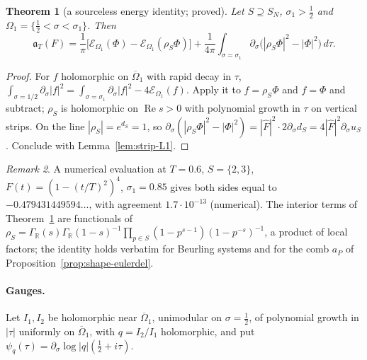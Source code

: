 \documentclass[11pt]{amsart}
\newtheorem{theorem}{Theorem}[section]
\theoremstyle{definition}
\theoremstyle{remark}
\newtheorem{remark}[theorem]{Remark}
\newcommand{\R}{\mathbb R}
\newcommand{\Rel}{\operatorname{Re}}
\newcommand{\Fh}{\widehat F}
\begin{document}
\begin{theorem}[a sourceless energy identity; proved]\label{thm:strip-R1}
Let $S\supseteq S_N$, $\sigma_1>\frac12$ and $\Omega_1=\{\frac12<\sigma<\sigma_1\}$. Then
\[
\mathfrak a_T(F)=\frac1\pi\big[\mathcal E_{\Omega_1}(\Phi)-\mathcal E_{\Omega_1}(\rho_S\Phi)\big]
+\frac1{4\pi}\int_{\sigma=\sigma_1}\partial_\sigma\big(|\rho_S\Phi|^2-|\Phi|^2\big)\,d\tau .
\]
\end{theorem}
\begin{proof}
For $f$ holomorphic on $\overline\Omega_1$ with rapid decay in $\tau$, $\int_{\sigma=1/2}\partial_\sigma|f|^2=\int_{\sigma=\sigma_1}\partial_\sigma|f|^2-4\mathcal E_{\Omega_1}(f)$.
Apply it to $f=\rho_S\Phi$ and $f=\Phi$ and subtract; $\rho_S$ is holomorphic on $\Rel s>0$ with polynomial growth in $\tau$ on
vertical strips. On the line $|\rho_S|=e^{d_S}=1$, so $\partial_\sigma(|\rho_S\Phi|^2-|\Phi|^2)=|\Fh|^2\cdot2\partial_\sigma d_S=4|\Fh|^2\partial_\sigma u_S$.
Conclude with Lemma~\ref{lem:strip-L1}.
\end{proof}

\begin{remark}
A numerical evaluation at $T=0.6$, $S=\{2,3\}$, $F(t)=(1-(t/T)^2)^4$, $\sigma_1=0.85$ gives both sides equal to $-0.479431449594\ldots$,
with agreement $1.7\cdot10^{-13}$ (numerical). The interior terms of Theorem~\ref{thm:strip-R1} are functionals of
$\rho_S=\Gamma_\R(s)\Gamma_\R(1-s)^{-1}\prod_{p\in S}(1-p^{s-1})(1-p^{-s})^{-1}$, a product of local factors; the identity holds verbatim for
Beurling systems and for the comb $a_P$ of Proposition~\ref{prop:shape-eulerdel}.
\end{remark}

\paragraph{Gauges.} Let $I_1,I_2$ be holomorphic near $\overline\Omega_1$, unimodular on $\sigma=\frac12$, of polynomial growth in $|\tau|$
uniformly on $\overline\Omega_1$, with $q=I_2/I_1$ holomorphic, and put $\psi_q(\tau)=\partial_\sigma\log|q|(\frac12+i\tau)$.
\end{document}
